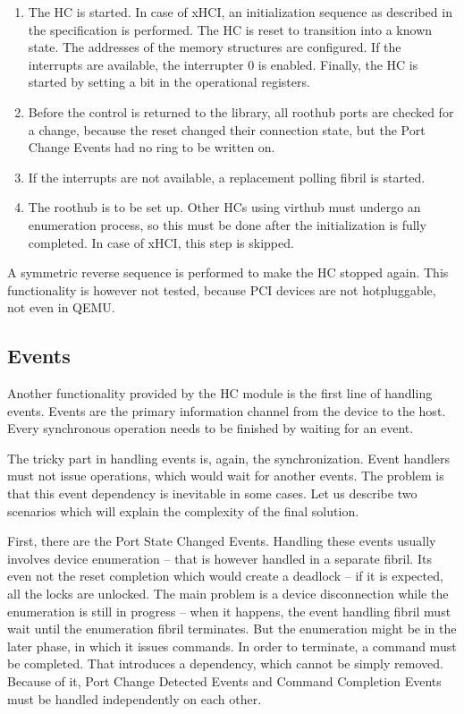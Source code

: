 \begin{enumerate}
\item
	The HC is started. In case of xHCI, an initialization sequence as described
	in the specification is performed. The HC is reset to transition into
	a known state. The addresses of the memory structures are configured. If
	the interrupts are available, the interrupter 0 is enabled. Finally, the HC
	is started by setting a bit in the operational registers.

\item
	Before the control is returned to the library, all roothub ports are
	checked for a change, because the reset changed their connection state,
	but the Port Change Events had no ring to be written on.

\item
	If the interrupts are not available, a replacement polling fibril is
	started.

\item
	The roothub is to be set up. Other HCs using virthub must undergo an
	enumeration process, so this must be done after the initialization is fully
	completed. In case of xHCI, this step is skipped.
\end{enumerate}

A symmetric reverse sequence is performed to make the HC stopped again. This
functionality is however not tested, because PCI devices are not hotpluggable,
not even in QEMU.

\subsection{Events}
\label{sec:events}

Another functionality provided by the HC module is the first line of handling
events. Events are the primary information channel from the device to the host.
Every synchronous operation needs to be finished by waiting for an event.

The tricky part in handling events is, again, the synchronization. Event
handlers must not issue operations, which would wait for another events. The
problem is that this event dependency is inevitable in some cases. Let us
describe two scenarios which will explain the complexity of the final solution.

First, there are the Port State Changed Events. Handling these events usually
involves device enumeration -- that is however handled in a separate fibril.
Its even not the reset completion which would create a deadlock -- if it is
expected, all the locks are unlocked. The main problem is a device
disconnection while the enumeration is still in progress -- when it happens,
the event handling fibril must wait until the enumeration fibril terminates.
But the enumeration might be in the later phase, in which it issues commands.
In order to terminate, a command must be completed. That introduces
a dependency, which cannot be simply removed. Because of it, Port Change
Detected Events and Command Completion Events must be handled independently on
each other.

